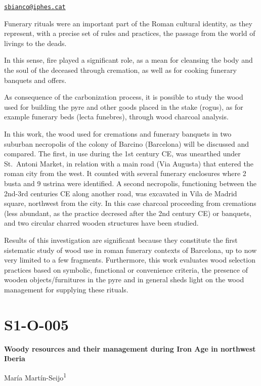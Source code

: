 \documentclass[
]{book}
\begin{document}
\href{mailto:sbianco@iphes.cat}{\nolinkurl{sbianco@iphes.cat}}

Funerary rituals were an important part of the Roman cultural identity, as they represent, with a precise set of rules and practices, the passage from the world of livings to the deads.

In this sense, fire played a significant role, as a mean for cleansing the body and the soul of the deceased through cremation, as well as for cooking funerary banquets and offers.

As consequence of the carbonization process, it is possible to study the wood used for building the pyre and other goods placed in the stake (rogus), as for example funerary beds (lecta funebres), through wood charcoal analysis.

In this work, the wood used for cremations and funerary banquets in two suburban necropolis of the colony of Barcino (Barcelona) will be discussed and compared. The first, in use during the 1st century CE, was unearthed under St.~Antoni Market, in relation with a main road (Via Augusta) that entered the roman city from the west. It counted with several funerary enclosures where 2 busta and 9 ustrina were identified. A second necropolis, functioning between the 2nd-3rd centuries CE along another road, was excavated in Vila de Madrid square, northwest from the city. In this case charcoal proceeding from cremations (less abundant, as the practice decresed after the 2nd century CE) or banquets, and two circular charred wooden structures have been studied.

Results of this investigation are significant because they constitute the first sistematic study of wood use in roman funerary contexts of Barcelona, up to now very limited to a few fragments. Furthermore, this work evaluates wood selection practices based on symbolic, functional or convenience criteria, the presence of wooden objects/furnitures in the pyre and in general sheds light on the wood management for supplying these rituals.

\hypertarget{s1-o-005}{%
\section*{S1-O-005}\label{s1-o-005}}

\textbf{Woody resources and their management during Iron Age in northwest Iberia}

María Martín-Seijo\textsuperscript{1}
\end{document}
